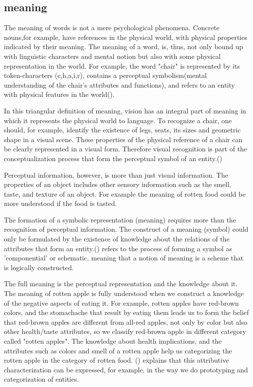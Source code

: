 \documentclass[11pt, a4paper]{article}
\begin{document}
\subsection{meaning}

The  meaning of words is not a mere psychological phenomena. Concrete nouns,for example, have references in the physical world, with physical properties indicated by their meaning. The meaning of a word, is, thus, not only bound up with linguistic characters and mental notion but also with some physical representation in the world. For example, the word "chair" is represented by its token-characters (c,h,a,i,r), contains a perceptual symbolism(mental understanding of the chair's attributes and functions), and refers to an entity with physical features in the world(\cite{mooney}).

In this triangular definition of meaning, vision has an integral part of meaning in which it represents the physical world to language. To recognize a chair, one should, for example, identify the existence of legs, seats, its sizes and geometric shape in a visual scene. These properties of the physical reference of a chair can be clearly represented in a visual form. Therefore visual recognition is part of the conceptualization process that form the perceptual symbol of an entity.(\cite{barsalou1999perceptual})

Perceptual information, however, is more than just visual information. The properties of an object includes other sensory information such as the smell, taste, and texture of an object. For example the meaning of rotten food could be more understood if the food is tasted. 

The formation of a symbolic representation (meaning) requires more than the recognition of perceptual information. The construct of a meaning (symbol) could only be formulated by the existence of knowledge about the relations of the attributes that form an entity.(\cite{barsalou1999perceptual}) refers to the process of forming a symbol as 'componential' or schematic, meaning that a  notion of meaning is a scheme that is logically constructed.

The full meaning is the perceptual representation and the knowledge about it. The meaning of rotten apple is fully understood when we construct a knowledge of the negative aspects of eating it. For example, rotten apples have red-brown colors, and the stomachache that result by eating them leads us to form the  belief that red-brown apples are different from all-red apples, not only by color but also other health/taste attributes, so we classify red-brown apple in different category called "rotten apples". The knowledge about health implications, and the attributes such as colors and smell of a rotten apple help us categorizing the rotten apple in the category of rotten food. (\cite{lakoff2008metaphors}) explains that this attributive characterization can be expressed, for example, in the way we do prototyping and categorization of entities.
\end{document}
